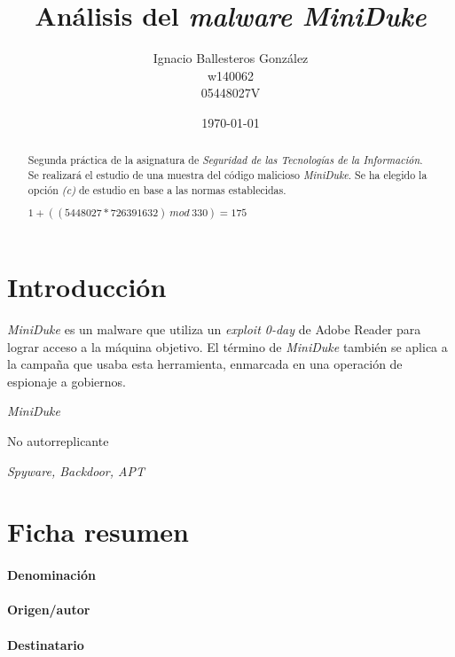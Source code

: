 \documentclass[11pt,a4paper]{article}
\title{Análisis del \emph{malware MiniDuke}}
\author{\begin{tabular}[center]{c}
          Ignacio Ballesteros González \\
          \small w140062 \\
          \small 05448027V \\
        \end{tabular}
      }
\date{\today}
\begin{document}
\maketitle
\tableofcontents
\normalsize
\begin{abstract}
  Segunda práctica de la asignatura de \emph{Seguridad de las
    Tecnologías de la Información}. Se realizará el estudio de una
  muestra del código malicioso \emph{MiniDuke}. Se ha elegido la
  opción \textit{(c)} de estudio en base a las normas establecidas.

  \begin{center}
    $1 + ((5448027 * 726391632)~mod~330) = 175$
  \end{center}
\end{abstract}

\section{Introducción}
\label{sec:intro}
\emph{MiniDuke} es un malware que utiliza un \emph{exploit 0-day} de Adobe
Reader para lograr acceso a la máquina objetivo. El término de
\emph{MiniDuke} también se aplica a la campaña que usaba esta
herramienta, enmarcada en una operación de espionaje a gobiernos. \cite{Dukes}

\begin{description}[leftmargin=9em,style=nextline]
  \item[Código malicioso] \emph{MiniDuke}
  \item[Tipo] No autorreplicante
  \item[Familia] \emph{Spyware, Backdoor, APT}
\end{description}

\section{Ficha resumen}
\label{sec:resumen}

\paragraph{Denominación}

\paragraph{Origen/autor}

\paragraph{Destinatario}
\end{document}
